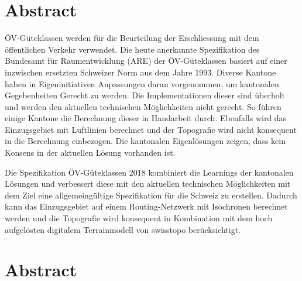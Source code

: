 
\chapter*{Abstract}
ÖV-Güteklassen werden für die Beurteilung der Erschliessung mit dem öffentlichen Verkehr verwendet.
Die heute anerkannte Spezifikation des Bundesamt für Raumentwicklung (ARE) der ÖV-Güteklassen basiert auf einer inzwischen ersetzten Schweizer Norm aus dem Jahre 1993.
Diverse Kantone haben in Eigeninitiativen Anpassungen daran vorgenommen, um kantonalen Gegebenheiten Gerecht zu werden.
Die Implementationen dieser sind überholt und werden den aktuellen technischen Möglichkeiten nicht gerecht.
So führen einige Kantone die Berechnung dieser in Handarbeit durch.
Ebenfalls wird das Einzugsgebiet mit Luftlinien berechnet und der Topografie wird nicht konsequent in die Berechnung einbezogen.
Die kantonalen Eigenlösungen zeigen, dass kein Konsens in der aktuellen Lösung vorhanden ist.

Die Spezifikation ÖV-Güteklassen 2018 kombiniert die Learnings der kantonalen Lösungen und verbessert diese mit den aktuellen technischen Möglichkeiten mit dem Ziel eine allgemeingültige Spezifikation für die Schweiz zu erstellen.
Dadurch kann das Einzugsgebiet auf einem Routing-Netzwerk mit Isochronen berechnet werden und die Topografie wird konsequent in Kombination mit dem  hoch aufgelösten digitalem Terrainmodell von swisstopo berücksichtigt.


\cleardoublepage

\chapter*{Abstract}

